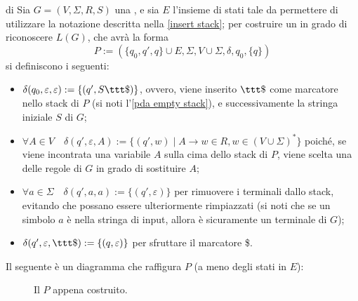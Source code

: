 \documentclass[a4paper, 12pt]{report}
\begin{document}
    \begin{framedmeth}[label={cfg into pda}]{\PDA di \CFG}
        Sia $G = (V, \Sigma, R, S)$ una \CFG, e sia $E$ l'insieme di stati tale da permettere di utilizzare la notazione descritta nella \cref{insert stack}; per costruire un \PDA in grado di riconoscere $L(G)$, che avrà la forma $$P := (\{q_0, q', q\} \cup E, \Sigma, V \cup \Sigma, \delta, q_0, \{q\})$$ si definiscono i seguenti:

        \begin{itemize}
            \item $\delta(q_0, \varepsilon, \varepsilon) := \{(q', S \ttt \$) \}$, ovvero, viene inserito $\ttt \$$ come marcatore nello stack di $P$ (si noti l'\cref{pda empty stack}), e successivamente la stringa iniziale $S$ di $G$;
            \item $\forall A \in V \quad \delta(q', \varepsilon, A) := \{ (q', w) \mid A \to w \in R, w \in (V \cup \Sigma)^*\}$ poiché, se viene incontrata una variabile $A$ sulla cima dello stack di $P$, viene scelta  una delle regole di $G$ in grado di sostituire $A$;
            \item $\forall a \in \Sigma \quad \delta(q', a, a) := \{ (q', \varepsilon) \}$ per rimuovere i terminali dallo stack, evitando che possano essere ulteriormente rimpiazzati (si noti che se un simbolo $a$ è nella stringa di input, allora è sicuramente un terminale di $G$);
            \item $\delta(q', \varepsilon, \ttt \$) := \{(q, \varepsilon) \}$ per sfruttare il marcatore \ttt \$.
        \end{itemize}

        Il seguente è un diagramma che raffigura $P$ (a meno degli stati in $E$):

        \begin{figure}[H]
            \centering
             \caption{Il \PDA $P$ appena costruito.}
        \end{figure}
    \end{framedmeth}
\end{document}

